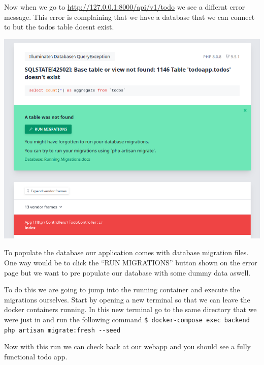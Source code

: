 \documentclass{csse4400}
\begin{document}
Now when we go to \url{http://127.0.0.1:8000/api/v1/todo} we see a differnt error 
message. This error is complaining that we have a database that we can connect to 
but the todos table doesnt exist.

\includegraphics[width=\textwidth]{images/missing-tables}

To populate the database our application comes with database migration files. One way 
would be to click the ``RUN MIGRATIONS'' button shown on the error page but we 
want to pre populate our database with some dummy data aswell.

To do this we are going to jump into the running container and execute the migrations 
ourselves. Start by opening a new terminal so that we can leave the docker containers running.
In this new terminal go to the same directory that we were just in and run the following 
command \lstinline[language=shell]{$ docker-compose exec backend php artisan migrate:fresh --seed}


Now with this run we can check back at our webapp and you should see a fully 
functional todo app.
\end{document}
